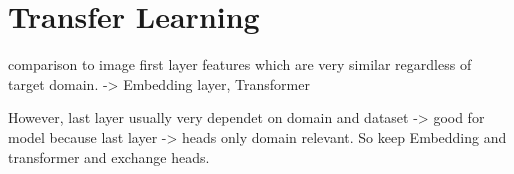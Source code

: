 

\section{Transfer Learning}

comparison to image first layer features which are very similar regardless of target domain. \cite{Yosinski2014} -> Embedding layer, Transformer

However, last layer usually very dependet on domain and dataset -> good for model because last layer -> heads only domain relevant. So keep Embedding and transformer and exchange heads.

